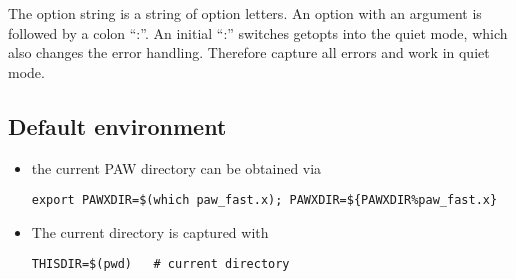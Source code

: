 \documentclass[11pt,a4paper]{report}
\begin{document}
The option string is a string of option letters. An option with an
argument is followed by a colon ``:''. An initial ``:'' switches
getopts into the quiet mode, which also changes the error
handling. Therefore capture all errors and work in quiet mode.


\subsection{Default environment}
\begin{itemize}
\item the current PAW directory can be obtained via
\begin{verbatim}
export PAWXDIR=$(which paw_fast.x); PAWXDIR=${PAWXDIR%paw_fast.x}
\end{verbatim}
%
\item The current directory is captured with
\begin{verbatim}
THISDIR=$(pwd)   # current directory
\end{verbatim}
\end{itemize}
\clearpage



\end{document}
